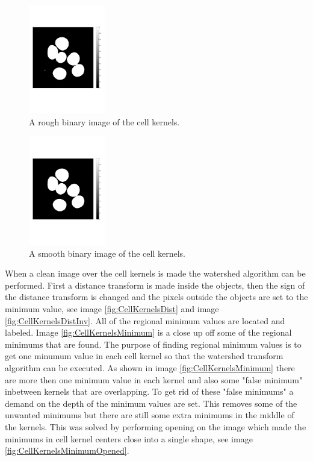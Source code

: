 \documentclass[10pt,twocolumn]{article}
\begin{document}
\begin{figure}[ht]
\centering
\includegraphics[width=0.3\textwidth]{Bilder/ThershholdedKernels.pdf}
\caption{A rough binary image of the cell kernels.}
\label{fig:CellKernelsThreshRough}
\end{figure}

\begin{figure}[ht]
\centering
\includegraphics[width=0.3\textwidth]{Bilder/BWCleanKernels.pdf}
\caption{A smooth binary image of the cell kernels.}
\label{fig:CellKernelsThresSmooth}
\end{figure}

When a clean image over the cell kernels is made the watershed algorithm can be performed.
First a distance transform is made inside the objects, then the sign
of the distance transform is changed and the pixels outside the objects are set
to the minimum value, see image \ref{fig:CellKernelsDist} and image \ref{fig:CellKernelsDistInv}. All of the regional minimum values
are located and labeled. Image \ref{fig:CellKernelsMinimum} is a close up off some of the regional minimums that are found.
The purpose of finding regional minimum values is to get one minumum value in each cell kernel so that
the watershed transform algorithm can be executed. As shown in image \ref{fig:CellKernelsMinimum} there are
more then one minimum value in each kernel and also some "false minimum" inbetween kernels that are overlapping.
To get rid of these "false minimums" a demand on the depth of the minimum values are set. This removes some of the unwanted
minimums but there are still some extra minimums in the middle of the kernels. This
was solved by performing opening on the image which made the minimums in cell kernel centers close into a single shape,
see image \ref{fig:CellKernelsMinimumOpened}.
\end{document}
